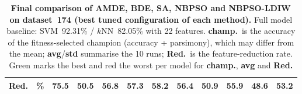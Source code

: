 \documentclass[12pt, openany]{article}
\begin{document}
\begin{table}[H]
{\begin{tabular}{|c | c | c c c c c | c c c c c |}
        \textbf{Red.} & \textbf{\%} & \cellcolor{best}75.5 & \cellcolor{worst}50.5 & 56.8 & 57.3 & 58.2 & \cellcolor{best}56.4 & 50.9 & 55.9 & \cellcolor{worst}48.6 & 53.2 \\ \hline
    \end{tabular}
    }
    \caption{\textbf{Final comparison of AMDE, BDE, SA, NBPSO and NBPSO-LDIW on dataset~174 (best tuned configuration of each method).} Full model baseline: SVM~92.31\% / $k$NN~82.05\% with 22 features. \textbf{champ.}~is the accuracy of the fitness-selected champion (accuracy + parsimony), which may differ from the mean; \textbf{avg}/\textbf{std} summarise the 10 runs; \textbf{Red.}~is the feature-reduction rate. Green marks the best and red the worst per model for \textbf{champ.}, \textbf{avg} and \textbf{Red.}}
    \label{tab:results_final_comparison_d174}
\end{table}
 
\end{document}

